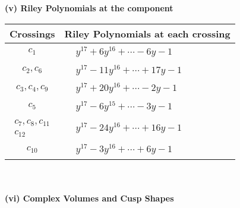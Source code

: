 \documentclass[1p]{elsarticle_modified}
\theoremstyle{definition}
\begin{document}
\newpage\renewcommand{\arraystretch}{1}
\flushleft \textbf{(v) Riley Polynomials at the component}\newline \\
\begin{tabular}{m{50pt}|m{274pt}}
Crossings & \hspace{64pt}Riley Polynomials at each crossing \\
\hline $$\begin{aligned}c_{1}\end{aligned}$$&$\begin{aligned}
&y^{17}+6 y^{16}+\cdots-6 y-1
\end{aligned}$\\
\hline $$\begin{aligned}c_{2},c_{6}\end{aligned}$$&$\begin{aligned}
&y^{17}-11 y^{16}+\cdots+17 y-1
\end{aligned}$\\
\hline $$\begin{aligned}c_{3},c_{4},c_{9}\end{aligned}$$&$\begin{aligned}
&y^{17}+20 y^{16}+\cdots-2 y-1
\end{aligned}$\\
\hline $$\begin{aligned}c_{5}\end{aligned}$$&$\begin{aligned}
&y^{17}-6 y^{15}+\cdots-3 y-1
\end{aligned}$\\
\hline $$\begin{aligned}c_{7},c_{8},c_{11}\\c_{12}\end{aligned}$$&$\begin{aligned}
&y^{17}-24 y^{16}+\cdots+16 y-1
\end{aligned}$\\
\hline $$\begin{aligned}c_{10}\end{aligned}$$&$\begin{aligned}
&y^{17}-3 y^{16}+\cdots+6 y-1
\end{aligned}$\\
\hline
\end{tabular}\\~\\
\newpage\flushleft \textbf{(vi) Complex Volumes and Cusp Shapes}
\end{document}
